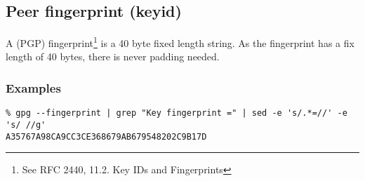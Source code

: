 \subsection{Peer fingerprint (keyid)}
A (PGP) fingerprint\footnote{See RFC 2440\cite{rfc2440}, 11.2. Key IDs and Fingerprints}
is a 40 byte fixed length string. As the fingerprint has a fix length of
40 bytes, there is never padding needed.
\subsubsection{Examples}
\begin{verbatim}
% gpg --fingerprint | grep "Key fingerprint =" | sed -e 's/.*=//' -e 's/ //g'
A35767A98CA9CC3CE368679AB679548202C9B17D
\end{verbatim}
